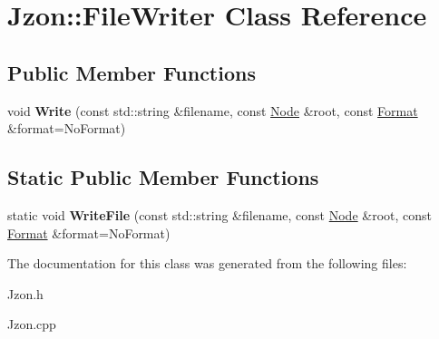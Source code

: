 \hypertarget{class_jzon_1_1_file_writer}{\section{Jzon\-:\-:File\-Writer Class Reference}
\label{class_jzon_1_1_file_writer}
}
\subsection*{Public Member Functions}
\begin{DoxyCompactItemize}
\item 
\hypertarget{class_jzon_1_1_file_writer_a170d50265040d8af69b56e6df9d9c9b5}{void {\bfseries Write} (const std\-::string \&filename, const \hyperlink{class_jzon_1_1_node}{Node} \&root, const \hyperlink{struct_jzon_1_1_format}{Format} \&format=No\-Format)}\label{class_jzon_1_1_file_writer_a170d50265040d8af69b56e6df9d9c9b5}

\end{DoxyCompactItemize}
\subsection*{Static Public Member Functions}
\begin{DoxyCompactItemize}
\item 
\hypertarget{class_jzon_1_1_file_writer_a328d967c23e182ed418e517c1bb15289}{static void {\bfseries Write\-File} (const std\-::string \&filename, const \hyperlink{class_jzon_1_1_node}{Node} \&root, const \hyperlink{struct_jzon_1_1_format}{Format} \&format=No\-Format)}\label{class_jzon_1_1_file_writer_a328d967c23e182ed418e517c1bb15289}

\end{DoxyCompactItemize}


The documentation for this class was generated from the following files\-:\begin{DoxyCompactItemize}
\item 
Jzon.\-h\item 
Jzon.\-cpp\end{DoxyCompactItemize}
